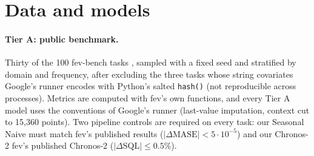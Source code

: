 \section{Data and models}
\label{sec:data}

\paragraph{Tier A: public benchmark.} Thirty of the 100 fev-bench tasks \citep{shchur2025fevbench}, sampled with a fixed seed and
stratified by domain and frequency, after excluding the three tasks whose string covariates Google's runner encodes with Python's
salted \texttt{hash()} (not reproducible across processes). Metrics are computed with fev's own functions, and every Tier A model uses
the conventions of Google's runner (last-value imputation, context cut to 15{,}360 points). Two pipeline controls are required on
every task: our Seasonal Naive must match fev's published results ($|\Delta\mathrm{MASE}| < 5\cdot10^{-5}$) and our Chronos-2 fev's
published Chronos-2 ($|\Delta\mathrm{SQL}| \le 0.5\%$).

